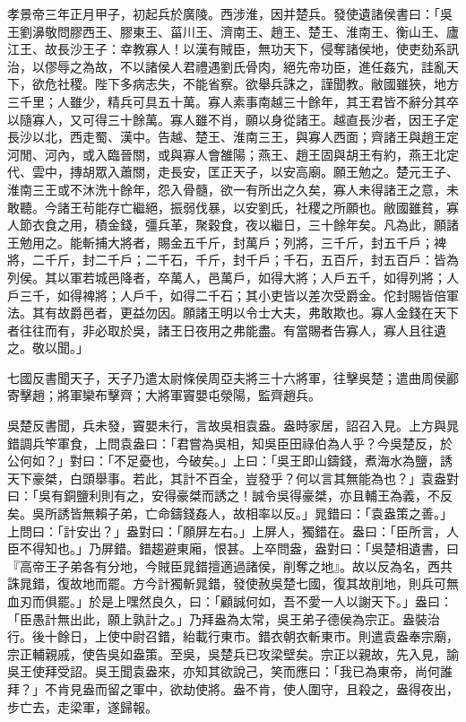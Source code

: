 \begin{pinyinscope}
孝景帝三年正月甲子，初起兵於廣陵。西涉淮，因并楚兵。發使遺諸侯書曰：「吳王劉濞敬問膠西王、膠東王、菑川王、濟南王、趙王、楚王、淮南王、衡山王、廬江王、故長沙王子：幸教寡人！以漢有賊臣，無功天下，侵奪諸侯地，使吏劾系訊治，以僇辱之為故，不以諸侯人君禮遇劉氏骨肉，絕先帝功臣，進任姦宄，詿亂天下，欲危社稷。陛下多病志失，不能省察。欲舉兵誅之，謹聞教。敝國雖狹，地方三千里；人雖少，精兵可具五十萬。寡人素事南越三十餘年，其王君皆不辭分其卒以隨寡人，又可得三十餘萬。寡人雖不肖，願以身從諸王。越直長沙者，因王子定長沙以北，西走蜀、漢中。告越、楚王、淮南三王，與寡人西面；齊諸王與趙王定河閒、河內，或入臨晉關，或與寡人會雒陽；燕王、趙王固與胡王有約，燕王北定代、雲中，摶胡眾入蕭關，走長安，匡正天子，以安高廟。願王勉之。楚元王子、淮南三王或不沐洗十餘年，怨入骨髓，欲一有所出之久矣，寡人未得諸王之意，未敢聽。今諸王茍能存亡繼絕，振弱伐暴，以安劉氏，社稷之所願也。敝國雖貧，寡人節衣食之用，積金錢，彊兵革，聚穀食，夜以繼日，三十餘年矣。凡為此，願諸王勉用之。能斬捕大將者，賜金五千斤，封萬戶；列將，三千斤，封五千戶；裨將，二千斤，封二千戶；二千石，千斤，封千戶；千石，五百斤，封五百戶：皆為列侯。其以軍若城邑降者，卒萬人，邑萬戶，如得大將；人戶五千，如得列將；人戶三千，如得裨將；人戶千，如得二千石；其小吏皆以差次受爵金。佗封賜皆倍軍法。其有故爵邑者，更益勿因。願諸王明以令士大夫，弗敢欺也。寡人金錢在天下者往往而有，非必取於吳，諸王日夜用之弗能盡。有當賜者告寡人，寡人且往遺之。敬以聞。」

七國反書聞天子，天子乃遣太尉條侯周亞夫將三十六將軍，往擊吳楚；遣曲周侯酈寄擊趙；將軍欒布擊齊；大將軍竇嬰屯滎陽，監齊趙兵。

吳楚反書聞，兵未發，竇嬰未行，言故吳相袁盎。盎時家居，詔召入見。上方與晁錯調兵笇軍食，上問袁盎曰：「君嘗為吳相，知吳臣田祿伯為人乎？今吳楚反，於公何如？」對曰：「不足憂也，今破矣。」上曰：「吳王即山鑄錢，煮海水為鹽，誘天下豪桀，白頭舉事。若此，其計不百全，豈發乎？何以言其無能為也？」袁盎對曰：「吳有銅鹽利則有之，安得豪桀而誘之！誠令吳得豪桀，亦且輔王為義，不反矣。吳所誘皆無賴子弟，亡命鑄錢姦人，故相率以反。」晁錯曰：「袁盎策之善。」上問曰：「計安出？」盎對曰：「願屏左右。」上屏人，獨錯在。盎曰：「臣所言，人臣不得知也。」乃屏錯。錯趨避東廂，恨甚。上卒問盎，盎對曰：「吳楚相遺書，曰『高帝王子弟各有分地，今賊臣晁錯擅適過諸侯，削奪之地』。故以反為名，西共誅晁錯，復故地而罷。方今計獨斬晁錯，發使赦吳楚七國，復其故削地，則兵可無血刃而俱罷。」於是上嘿然良久，曰：「顧誠何如，吾不愛一人以謝天下。」盎曰：「臣愚計無出此，願上孰計之。」乃拜盎為太常，吳王弟子德侯為宗正。盎裝治行。後十餘日，上使中尉召錯，紿載行東市。錯衣朝衣斬東市。則遣袁盎奉宗廟，宗正輔親戚，使告吳如盎策。至吳，吳楚兵已攻梁壁矣。宗正以親故，先入見，諭吳王使拜受詔。吳王聞袁盎來，亦知其欲說己，笑而應曰：「我已為東帝，尚何誰拜？」不肯見盎而留之軍中，欲劫使將。盎不肯，使人圍守，且殺之，盎得夜出，步亡去，走梁軍，遂歸報。


\end{pinyinscope}
